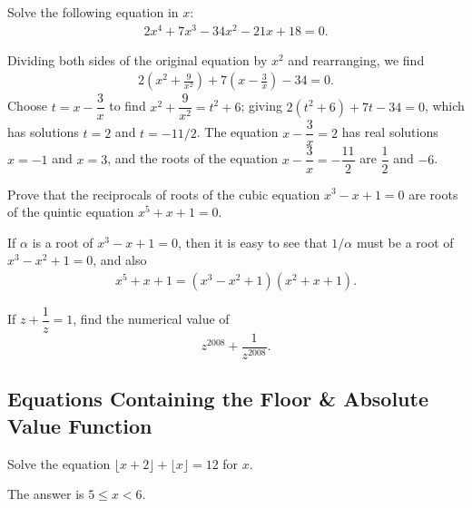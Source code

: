 \documentclass[12pt,a4paper]{memoir}
\theoremstyle{definition}
\begin{document}
\begin{question}
	Solve the following equation in $x$:
	\begin{align*}
		2x^4+7x^3-34x^2-21x+18=0.
	\end{align*}
\end{question}

\begin{solution}
	Dividing both sides of the original equation by $x^2$ and rearranging, we find 
	\begin{align*}
		2\left(x^2+\frac{9}{x^2}\right) + 7\left(x-\frac{3}{x}\right) - 34=0.
	\end{align*}
	Choose $t=x-\dfrac{3}{x}$ to find $x^2+\dfrac{9}{x^2}=t^2+6$; giving $2(t^2+6)+7t-34=0$, which has solutions $t=2$ and $t=-11/2$. The equation $x-\dfrac{3}{x}=2$ has real solutions $x=-1$ and $x=3$, and the roots of the equation $x-\dfrac{3}{x}=-\dfrac{11}{2}$ are $\dfrac{1}{2}$ and $-6$. 
\end{solution}


\begin{question}
	Prove that the reciprocals of roots of the cubic equation $x^3-x+1=0$ are roots of the quintic equation $x^5+x+1=0$.
\end{question}

\begin{solution}
	If $\alpha$ is a root of $x^3-x+1=0$, then it is easy to see that $1/\alpha$ must be a root of $x^3-x^2+1=0$, and also
	\begin{align*}
		x^5+x+1 = (x^3-x^2+1)(x^2+x+1).
	\end{align*}
\end{solution}



\begin{question}[name={2008 Ecuador TST}]
	If $z+\dfrac{1}{z}=1$, find the numerical value of \[z^{2008}+\frac{1}{z^{2008}}.\]
\end{question}



\subsection{Equations Containing the Floor \& Absolute Value Function}

\begin{question}
	Solve the equation $\lfloor x+2 \rfloor + \lfloor x \rfloor = 12$ for $x$.
\end{question}

\begin{solution}
	The answer is $5\leq x < 6$.
\end{solution}
\end{document}
